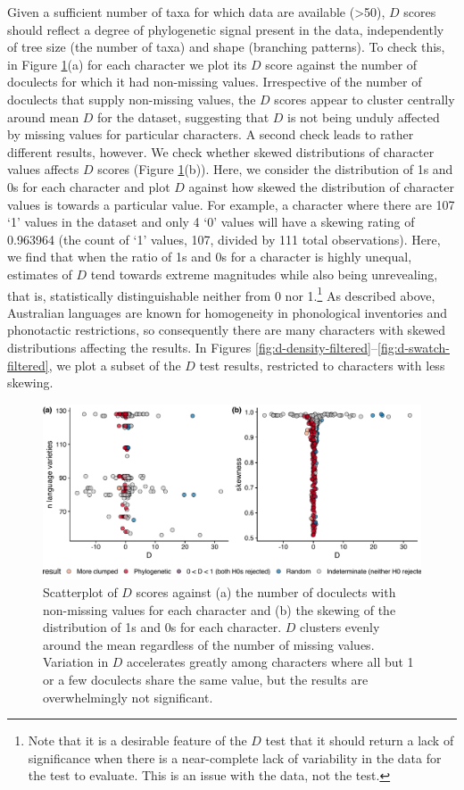 Given a sufficient number of taxa for which data are available (\textgreater{}50), \(D\) scores should reflect a degree of phylogenetic signal present in the data, independently of tree size (the number of taxa) and shape (branching patterns). To check this, in Figure \ref{fig:d-scatterplots}(a) for each character we plot its \(D\) score against the number of doculects for which it had non-missing values. Irrespective of the number of doculects that supply non-missing values, the \(D\) scores appear to cluster centrally around mean \(D\) for the dataset, suggesting that \(D\) is not being unduly affected by missing values for particular characters. A second check leads to rather different results, however. We check whether skewed distributions of character values affects \(D\) scores (Figure \ref{fig:d-scatterplots}(b)). Here, we consider the distribution of 1s and 0s for each character and plot \(D\) against how skewed the distribution of character values is towards a particular value. For example, a character where there are 107 `1' values in the dataset and only 4 `0' values will have a skewing rating of 0.963964 (the count of `1' values, 107, divided by 111 total observations). Here, we find that when the ratio of 1s and 0s for a character is highly unequal, estimates of \(D\) tend towards extreme magnitudes while also being unrevealing, that is, statistically distinguishable neither from 0 nor 1.\footnote{Note that it is a desirable feature of the \(D\) test that it should return a lack of significance when there is a near-complete lack of variability in the data for the test to evaluate. This is an issue with the data, not the test.} As described above, Australian languages are known for homogeneity in phonological inventories and phonotactic restrictions, so consequently there are many characters with skewed distributions affecting the results. In Figures \ref{fig:d-density-filtered}--\ref{fig:d-swatch-filtered}, we plot a subset of the \(D\) test results, restricted to characters with less skewing.

\begin{figure}
\includegraphics[width=1\linewidth]{fig/d-scatterplots} \caption{Scatterplot of $D$ scores against (a) the number of doculects with non-missing values for each character and (b) the skewing of the distribution of 1s and 0s for each character. $D$ clusters evenly around the mean regardless of the number of missing values. Variation in $D$ accelerates greatly among characters where all but 1 or a few doculects share the same value, but the results are overwhelmingly not significant.}\label{fig:d-scatterplots}
\end{figure}

